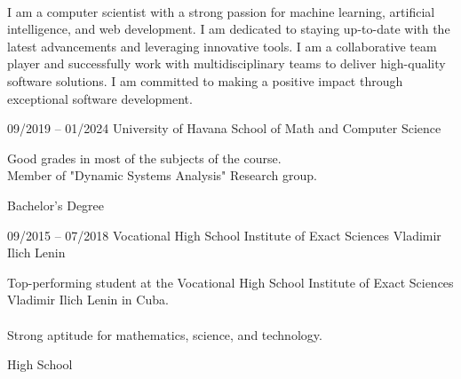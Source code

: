 \documentclass[9pt, blue]{./template/developercv} %
\begin{document}


\vspace{8pt}
\\
I am a computer scientist with a strong passion for machine learning, artificial intelligence, and web development.
I am dedicated to staying up-to-date with the latest advancements and leveraging innovative tools.
I am a collaborative team player and successfully work with multidisciplinary teams to deliver high-quality software solutions.
I am committed to making a positive impact through exceptional software development.






\vspace{2.1mm}
\begin{entrylist}
	\entry
	{09/2019 – 01/2024}
	{University of Havana}
	{School of Math and Computer Science}
	{
		\vspace{0.3mm}
		\begin{minipage}[t]{0.75\textwidth}
			\vspace{-\baselineskip}
			\itemmarker Good grades in most of the subjects of the course.\\
			\itemmarker Member of "Dynamic Systems Analysis" Research group. \\


		\end{minipage}
	}
	{Bachelor's Degree}



	\entry
		{09/2015 – 07/2018}
		{}
		{Vocational High School Institute of Exact Sciences Vladimir Ilich Lenin}
		{
			\vspace{0.3mm}
			\begin{minipage}[t]{0.75\textwidth}
				\vspace{-\baselineskip}
				\itemmarker Top-performing student at the Vocational High School Institute of Exact Sciences Vladimir Ilich Lenin in Cuba.\\
				\vspace{-3mm}\\
				\itemmarker Strong aptitude for mathematics, science, and technology. \\
				\vspace{-20mm}
			\end{minipage}
	   }
		{High School}
\end{entrylist}
\end{document}

